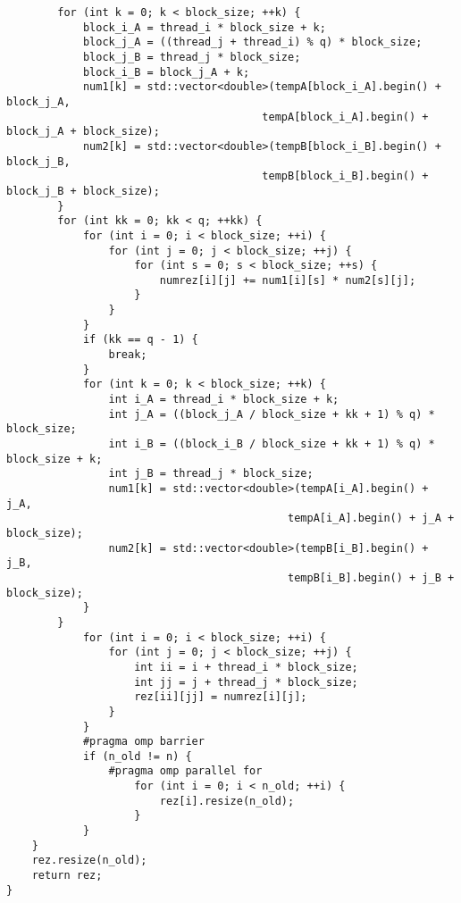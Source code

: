 \documentclass{report}
\begin{document}
\begin{lstlisting}
        for (int k = 0; k < block_size; ++k) {
            block_i_A = thread_i * block_size + k;
            block_j_A = ((thread_j + thread_i) % q) * block_size;
            block_j_B = thread_j * block_size;
            block_i_B = block_j_A + k;
            num1[k] = std::vector<double>(tempA[block_i_A].begin() + block_j_A,
                                        tempA[block_i_A].begin() + block_j_A + block_size);
            num2[k] = std::vector<double>(tempB[block_i_B].begin() + block_j_B,
                                        tempB[block_i_B].begin() + block_j_B + block_size);
        }
        for (int kk = 0; kk < q; ++kk) {
            for (int i = 0; i < block_size; ++i) {
                for (int j = 0; j < block_size; ++j) {
                    for (int s = 0; s < block_size; ++s) {
                        numrez[i][j] += num1[i][s] * num2[s][j];
                    }
                }
            }
            if (kk == q - 1) {
                break;
            }
            for (int k = 0; k < block_size; ++k) {
                int i_A = thread_i * block_size + k;
                int j_A = ((block_j_A / block_size + kk + 1) % q) * block_size;
                int i_B = ((block_i_B / block_size + kk + 1) % q) * block_size + k;
                int j_B = thread_j * block_size;
                num1[k] = std::vector<double>(tempA[i_A].begin() + j_A,
                                            tempA[i_A].begin() + j_A + block_size);
                num2[k] = std::vector<double>(tempB[i_B].begin() + j_B,
                                            tempB[i_B].begin() + j_B + block_size);
            }
        }
            for (int i = 0; i < block_size; ++i) {
                for (int j = 0; j < block_size; ++j) {
                    int ii = i + thread_i * block_size;
                    int jj = j + thread_j * block_size;
                    rez[ii][jj] = numrez[i][j];
                }
            }
            #pragma omp barrier
            if (n_old != n) {
                #pragma omp parallel for
                    for (int i = 0; i < n_old; ++i) {
                        rez[i].resize(n_old);
                    }
            }
    }
    rez.resize(n_old);
    return rez;
}

\end{lstlisting}
\end{document}
